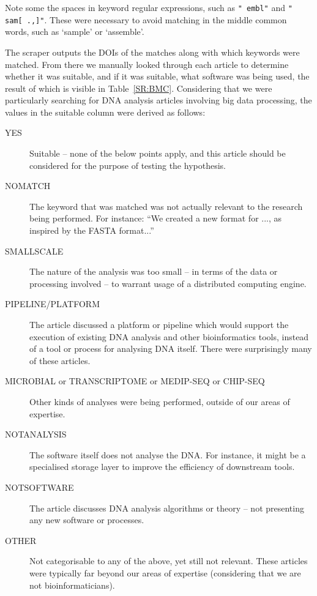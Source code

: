   Note some the spaces in keyword regular expressions, such as \texttt{" embl"} and \texttt{" sam[ .,]"}. These were necessary to avoid matching in the middle common words, such as `sample' or `assemble'.
  
  The scraper outputs the DOIs of the matches along with which keywords were matched. From there we manually looked through each article to determine whether it was suitable, and if it was suitable, what software was being used, the result of which is visible in Table~\ref{SR:BMC}. Considering that we were particularly searching for DNA analysis articles involving big data processing, the values in the suitable column were derived as follows:

  \begin{description}
    \item[YES] Suitable -- none of the below points apply, and this article should be considered for the purpose of testing the hypothesis.
    \item[NOMATCH] The keyword that was matched was not actually relevant to the research being performed. For instance: ``We created a new format for ..., as inspired by the FASTA format...''
    \item[SMALLSCALE] The nature of the analysis was too small -- in terms of the data or processing involved -- to warrant usage of a distributed computing engine.
    \item[PIPELINE/PLATFORM] The article discussed a platform or pipeline which would support the execution of existing DNA analysis and other bioinformatics tools, instead of a tool or process for analysing DNA itself. There were surprisingly many of these articles.
    \item[MICROBIAL or TRANSCRIPTOME or MEDIP-SEQ or CHIP-SEQ] Other kinds of analyses were being performed, outside of our areas of expertise.
    \item[NOTANALYSIS] The software itself does not analyse the DNA. For instance, it might be a specialised storage layer to improve the efficiency of downstream tools.
    \item[NOTSOFTWARE] The article discusses DNA analysis algorithms or theory -- not presenting any new software or processes.
    \item[OTHER] Not categorisable to any of the above, yet still not relevant. These articles were typically far beyond our areas of expertise (considering that we are not bioinformaticians).
  \end{description}

